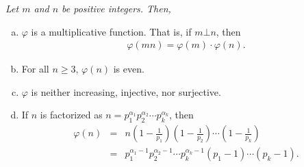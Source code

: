 \documentclass[12pt]{subfile}
\begin{document}
		\begin{theorem}\slshape\label{thm:phiproperties-ch:arith}
			Let $m$ and $n$ be positive integers. Then,
				\begin{enumerate}[(a)]
					\item $\varphi$ is a multiplicative function. That is, if $m \bot n$, then
						\begin{align*}
							\varphi(mn)=\varphi(m) \cdot \varphi (n).
						\end{align*}
					\item For all $n \geq 3$, $\varphi(n)$ is even.
					\item $\varphi$ is neither increasing, injective, nor surjective.
					\item If $n$ is factorized as $n= p_1^{\alpha_1} p_2^{\alpha_2} \cdots p_k^{\alpha_k}$, then
						\begin{eqnarray*}
							\varphi(n) & = & n \left( 1 - \frac{1}{p_1} \right)  \left( 1 - \frac{1}{p_2} \right)  \cdots \left( 1 - \frac{1}{p_k} \right)  \\
									   & = & p_1^{\alpha_1-1} p_2^{\alpha_2-1} \cdots p_k^{\alpha_k-1} \left( p_1 -1 \right) \cdots \left( p_k -1 \right).
						\end{eqnarray*}					
				\end{enumerate}
		\end{theorem}
		
\end{document}
